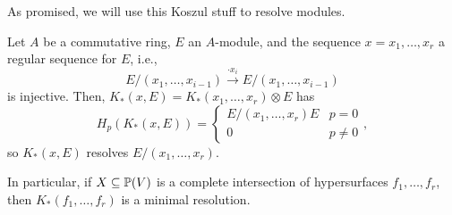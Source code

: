 \documentclass[12pt]{article}
\begin{document}
As promised, we will use this Koszul stuff to resolve modules.

\begin{prop}
    Let $A$ be a commutative ring, $E$ an $A$-module, and the sequence $x=x_1,\dots,x_r$ a regular sequence for $E$, i.e.,
    \[E/(x_1,\dots,x_{i-1}) \xrightarrow{\cdot x_i} E/(x_1,\dots,x_{i-1})\]
    is injective. Then, $K_*(x,E)=K_*(x_1,\dots,x_r)\otimes E$ has
    \[H_p(K_*(x,E)) = \begin{cases}
        E/(x_1,\dots,x_r)E & p=0\\
        0 & p\neq 0
    \end{cases},\]
    so $K_*(x,E)$ resolves $E/(x_1,\dots,x_r)$.
\end{prop}

In particular, if $X\subseteq \P(V)$ is a complete intersection of hypersurfaces $f_1,\dots,f_r$, then $K_*(f_1,\dots,f_r)$ is a minimal resolution.
\end{document}
